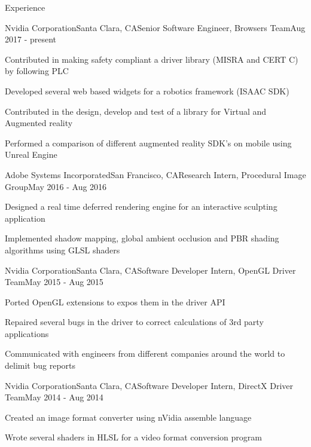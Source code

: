 \documentclass{resume} %
\begin{document}

\begin{rSection}{Experience}

\begin{rSubsection}{Nvidia Corporation}{Santa Clara, CA}{Senior Software Engineer, Browsers Team}{Aug 2017 - present}
\item Contributed in making safety compliant a driver library (MISRA and CERT C) by following PLC
\item Developed several web based widgets for a robotics framework (ISAAC SDK)
\item Contributed in the design, develop and test of a library for Virtual and Augmented reality
\item Performed a comparison of different augmented reality SDK's on mobile using Unreal Engine
\end{rSubsection}

\begin{rSubsection}{Adobe Systems Incorporated}{San Francisco, CA}{Research Intern, Procedural Image Group}{May 2016 - Aug 2016}
\item Designed a real time deferred rendering engine for an interactive sculpting application
\item Implemented shadow mapping, global ambient occlusion and PBR shading algorithms using GLSL shaders
\end{rSubsection}

\begin{rSubsection}{Nvidia Corporation}{Santa Clara, CA}{Software Developer Intern, OpenGL Driver Team}{May 2015 - Aug 2015}
\item Ported OpenGL extensions to expos them in the driver API
\item Repaired several bugs in the driver to correct calculations of 3rd party applications
\item Communicated with engineers from different companies around the world to delimit bug reports
\end{rSubsection}

\begin{rSubsection}{Nvidia Corporation}{Santa Clara, CA}{Software Developer Intern, DirectX Driver Team}{May 2014 - Aug 2014}
\item Created an image format converter using nVidia assemble language
\item Wrote several shaders in HLSL for a video format conversion program
\end{rSubsection}


\end{rSection}
\end{document}
